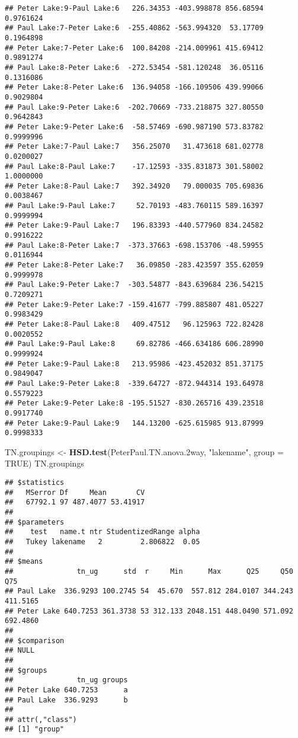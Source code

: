 \documentclass[]{article}
\newenvironment{Shaded}{\begin{snugshade}}{\end{snugshade}}
\newcommand{\DataTypeTok}[1]{\textcolor[rgb]{0.13,0.29,0.53}{#1}}
\newcommand{\FloatTok}[1]{\textcolor[rgb]{0.00,0.00,0.81}{#1}}
\newcommand{\KeywordTok}[1]{\textcolor[rgb]{0.13,0.29,0.53}{\textbf{#1}}}
\newcommand{\NormalTok}[1]{#1}
\newcommand{\OtherTok}[1]{\textcolor[rgb]{0.56,0.35,0.01}{#1}}
\newcommand{\StringTok}[1]{\textcolor[rgb]{0.31,0.60,0.02}{#1}}
\begin{document}
\begin{verbatim}
## Peter Lake:9-Paul Lake:6   226.34353 -403.998878 856.68594 0.9761624
## Paul Lake:7-Peter Lake:6  -255.40862 -563.994320  53.17709 0.1964898
## Peter Lake:7-Peter Lake:6  100.84208 -214.009961 415.69412 0.9891274
## Paul Lake:8-Peter Lake:6  -272.53454 -581.120248  36.05116 0.1316086
## Peter Lake:8-Peter Lake:6  136.94058 -166.109506 439.99066 0.9029804
## Paul Lake:9-Peter Lake:6  -202.70669 -733.218875 327.80550 0.9642843
## Peter Lake:9-Peter Lake:6  -58.57469 -690.987190 573.83782 0.9999996
## Peter Lake:7-Paul Lake:7   356.25070   31.473618 681.02778 0.0200027
## Paul Lake:8-Paul Lake:7    -17.12593 -335.831873 301.58002 1.0000000
## Peter Lake:8-Paul Lake:7   392.34920   79.000035 705.69836 0.0038467
## Paul Lake:9-Paul Lake:7     52.70193 -483.760115 589.16397 0.9999994
## Peter Lake:9-Paul Lake:7   196.83393 -440.577960 834.24582 0.9916222
## Paul Lake:8-Peter Lake:7  -373.37663 -698.153706 -48.59955 0.0116944
## Peter Lake:8-Peter Lake:7   36.09850 -283.423597 355.62059 0.9999978
## Paul Lake:9-Peter Lake:7  -303.54877 -843.639684 236.54215 0.7209271
## Peter Lake:9-Peter Lake:7 -159.41677 -799.885807 481.05227 0.9983429
## Peter Lake:8-Paul Lake:8   409.47512   96.125963 722.82428 0.0020552
## Paul Lake:9-Paul Lake:8     69.82786 -466.634186 606.28990 0.9999924
## Peter Lake:9-Paul Lake:8   213.95986 -423.452032 851.37175 0.9849047
## Paul Lake:9-Peter Lake:8  -339.64727 -872.944314 193.64978 0.5579223
## Peter Lake:9-Peter Lake:8 -195.51527 -830.265716 439.23518 0.9917740
## Peter Lake:9-Paul Lake:9   144.13200 -625.615985 913.87999 0.9998333
\end{verbatim}

\begin{Shaded}
\begin{Highlighting}[]
\NormalTok{TN.groupings <-}\StringTok{ }\KeywordTok{HSD.test}\NormalTok{(PeterPaul.TN.anova}\FloatTok{.2}\NormalTok{way, }
                         \StringTok{"lakename"}\NormalTok{, }\DataTypeTok{group =} \OtherTok{TRUE}\NormalTok{)}
\NormalTok{TN.groupings}
\end{Highlighting}
\end{Shaded}

\begin{verbatim}
## $statistics
##   MSerror Df     Mean       CV
##   67792.1 97 487.4077 53.41917
## 
## $parameters
##    test   name.t ntr StudentizedRange alpha
##   Tukey lakename   2         2.806822  0.05
## 
## $means
##               tn_ug      std  r     Min      Max      Q25     Q50      Q75
## Paul Lake  336.9293 100.2745 54  45.670  557.812 284.0107 344.243 411.5165
## Peter Lake 640.7253 361.3738 53 312.133 2048.151 448.0490 571.092 692.4860
## 
## $comparison
## NULL
## 
## $groups
##               tn_ug groups
## Peter Lake 640.7253      a
## Paul Lake  336.9293      b
## 
## attr(,"class")
## [1] "group"
\end{verbatim}
\end{document}
